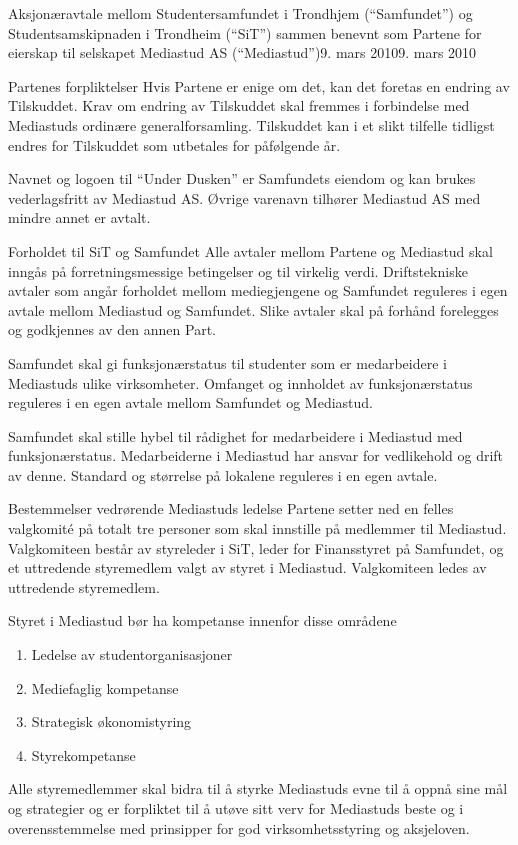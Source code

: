 \begin{instruks}{Aksjonæravtale mellom Studentersamfundet i Trondhjem
(``Samfundet'') og
Studentsamskipnaden i Trondheim (``SiT'') sammen benevnt som Partene for
eierskap til selskapet Mediastud AS (``Mediastud'')}{9. mars 2010}{9. mars 2010}
\begin{instruksledd}{Partenes forpliktelser}
	Hvis Partene er enige om det, kan det foretas en endring av Tilskuddet.
	Krav om endring av Tilskuddet skal fremmes i forbindelse med Mediastuds
	ordinære generalforsamling.  Tilskuddet kan i et slikt tilfelle tidligst
	endres for Tilskuddet som utbetales for påfølgende år.
	
	Navnet og logoen til ``Under Dusken'' er Samfundets eiendom og kan brukes
	vederlagsfritt av Mediastud AS. Øvrige varenavn tilhører Mediastud AS
	med mindre annet er avtalt.
	\end{instruksledd}

	\begin{instruksledd}{Forholdet til SiT og Samfundet}
	Alle avtaler mellom Partene og Mediastud skal inngås på
	forretningsmessige betingelser og til virkelig verdi. Driftstekniske
	avtaler som angår forholdet mellom mediegjengene og Samfundet reguleres
	i egen avtale mellom Mediastud og Samfundet. Slike avtaler skal på
	forhånd forelegges og godkjennes av den annen Part. 
	
	Samfundet skal gi funksjonærstatus til studenter som er medarbeidere i
	Mediastuds ulike virksomheter. Omfanget og innholdet av funksjonærstatus
	reguleres i en egen avtale mellom Samfundet og Mediastud.
	
	Samfundet skal stille hybel til rådighet for medarbeidere i Mediastud
	med funksjonærstatus.  Medarbeiderne i Mediastud har ansvar for
	vedlikehold og drift av denne. Standard og størrelse på lokalene
	reguleres i en egen avtale.
	\end{instruksledd}

	\begin{instruksledd}{Bestemmelser vedrørende Mediastuds ledelse}
		Partene setter ned en felles valgkomité på totalt tre personer
		som skal innstille på medlemmer til Mediastud. Valgkomiteen
		består av styreleder i SiT, leder for Finansstyret på Samfundet,
		og et uttredende styremedlem valgt av styret i Mediastud.
		Valgkomiteen ledes av uttredende styremedlem.

		Styret i Mediastud bør ha kompetanse innenfor disse områdene
		\begin{enumerate}
			\item Ledelse av studentorganisasjoner
			\item Mediefaglig kompetanse
			\item Strategisk økonomistyring
			\item Styrekompetanse
		\end{enumerate}

		Alle styremedlemmer skal bidra til å styrke Mediastuds evne til
		å oppnå sine mål og strategier og er forpliktet til å utøve sitt
		verv for Mediastuds beste og i overensstemmelse med prinsipper
		for god virksomhetsstyring og aksjeloven.


\end{instruksledd}
\end{instruks}
